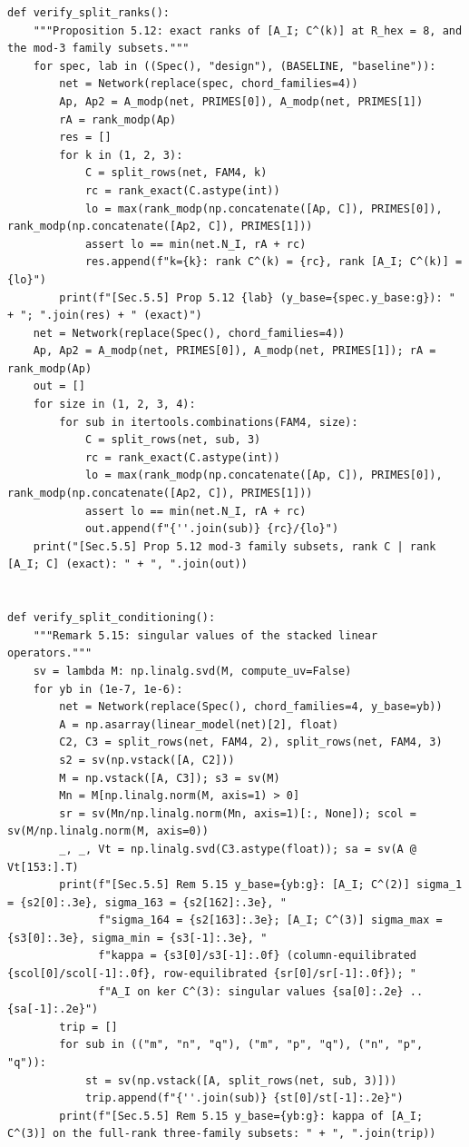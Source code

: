 \documentclass[11pt,a4paper]{article}
\theoremstyle{definition}
\theoremstyle{remark}
\begin{document}
\begin{lstlisting}
def verify_split_ranks():
    """Proposition 5.12: exact ranks of [A_I; C^(k)] at R_hex = 8, and the mod-3 family subsets."""
    for spec, lab in ((Spec(), "design"), (BASELINE, "baseline")):
        net = Network(replace(spec, chord_families=4))
        Ap, Ap2 = A_modp(net, PRIMES[0]), A_modp(net, PRIMES[1])
        rA = rank_modp(Ap)
        res = []
        for k in (1, 2, 3):
            C = split_rows(net, FAM4, k)
            rc = rank_exact(C.astype(int))
            lo = max(rank_modp(np.concatenate([Ap, C]), PRIMES[0]), rank_modp(np.concatenate([Ap2, C]), PRIMES[1]))
            assert lo == min(net.N_I, rA + rc)
            res.append(f"k={k}: rank C^(k) = {rc}, rank [A_I; C^(k)] = {lo}")
        print(f"[Sec.5.5] Prop 5.12 {lab} (y_base={spec.y_base:g}): " + "; ".join(res) + " (exact)")
    net = Network(replace(Spec(), chord_families=4))
    Ap, Ap2 = A_modp(net, PRIMES[0]), A_modp(net, PRIMES[1]); rA = rank_modp(Ap)
    out = []
    for size in (1, 2, 3, 4):
        for sub in itertools.combinations(FAM4, size):
            C = split_rows(net, sub, 3)
            rc = rank_exact(C.astype(int))
            lo = max(rank_modp(np.concatenate([Ap, C]), PRIMES[0]), rank_modp(np.concatenate([Ap2, C]), PRIMES[1]))
            assert lo == min(net.N_I, rA + rc)
            out.append(f"{''.join(sub)} {rc}/{lo}")
    print("[Sec.5.5] Prop 5.12 mod-3 family subsets, rank C | rank [A_I; C] (exact): " + ", ".join(out))


def verify_split_conditioning():
    """Remark 5.15: singular values of the stacked linear operators."""
    sv = lambda M: np.linalg.svd(M, compute_uv=False)
    for yb in (1e-7, 1e-6):
        net = Network(replace(Spec(), chord_families=4, y_base=yb))
        A = np.asarray(linear_model(net)[2], float)
        C2, C3 = split_rows(net, FAM4, 2), split_rows(net, FAM4, 3)
        s2 = sv(np.vstack([A, C2]))
        M = np.vstack([A, C3]); s3 = sv(M)
        Mn = M[np.linalg.norm(M, axis=1) > 0]
        sr = sv(Mn/np.linalg.norm(Mn, axis=1)[:, None]); scol = sv(M/np.linalg.norm(M, axis=0))
        _, _, Vt = np.linalg.svd(C3.astype(float)); sa = sv(A @ Vt[153:].T)
        print(f"[Sec.5.5] Rem 5.15 y_base={yb:g}: [A_I; C^(2)] sigma_1 = {s2[0]:.3e}, sigma_163 = {s2[162]:.3e}, "
              f"sigma_164 = {s2[163]:.3e}; [A_I; C^(3)] sigma_max = {s3[0]:.3e}, sigma_min = {s3[-1]:.3e}, "
              f"kappa = {s3[0]/s3[-1]:.0f} (column-equilibrated {scol[0]/scol[-1]:.0f}, row-equilibrated {sr[0]/sr[-1]:.0f}); "
              f"A_I on ker C^(3): singular values {sa[0]:.2e} .. {sa[-1]:.2e}")
        trip = []
        for sub in (("m", "n", "q"), ("m", "p", "q"), ("n", "p", "q")):
            st = sv(np.vstack([A, split_rows(net, sub, 3)]))
            trip.append(f"{''.join(sub)} {st[0]/st[-1]:.2e}")
        print(f"[Sec.5.5] Rem 5.15 y_base={yb:g}: kappa of [A_I; C^(3)] on the full-rank three-family subsets: " + ", ".join(trip))



\end{lstlisting}
\end{document}
